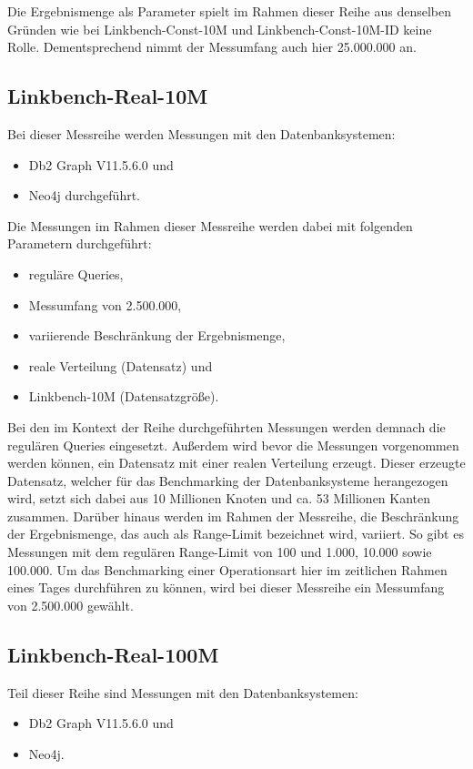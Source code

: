 Die Ergebnismenge als Parameter spielt im Rahmen dieser Reihe aus denselben Gründen wie bei Linkbench-Const-10M und Linkbench-Const-10M-ID keine Rolle. Dementsprechend nimmt der Messumfang auch hier 25.000.000 an.

\subsection{Linkbench-Real-10M}
Bei dieser Messreihe werden Messungen mit den Datenbanksystemen:
\begin{itemize}
    \item Db2 Graph V11.5.6.0 und 
    \item Neo4j durchgeführt. 
\end{itemize}

Die Messungen im Rahmen dieser Messreihe werden dabei mit folgenden Parametern durchgeführt:
\begin{itemize}
    \item reguläre Queries,
    \item Messumfang von 2.500.000,
    \item variierende Beschränkung der Ergebnismenge,
    \item reale Verteilung (Datensatz) und 
    \item Linkbench-10M (Datensatzgröße).
\end{itemize}
Bei den im Kontext der Reihe durchgeführten Messungen werden demnach die regulären Queries eingesetzt. Außerdem wird bevor die Messungen vorgenommen werden können, ein Datensatz mit einer realen Verteilung erzeugt. Dieser erzeugte Datensatz, welcher für das Benchmarking der Datenbanksysteme herangezogen wird, setzt sich dabei aus 10 Millionen Knoten und ca. 53 Millionen Kanten zusammen. Darüber hinaus werden im Rahmen der Messreihe, die Beschränkung der Ergebnismenge, das auch als Range-Limit bezeichnet wird, variiert. So gibt es Messungen mit dem regulären Range-Limit von 100 und 1.000, 10.000 sowie 100.000. Um das Benchmarking einer Operationsart hier im zeitlichen Rahmen eines Tages durchführen zu können, wird bei dieser Messreihe ein Messumfang von 2.500.000 gewählt. 

\subsection{Linkbench-Real-100M}
Teil dieser Reihe sind Messungen mit den Datenbanksystemen:
\begin{itemize}
    \item Db2 Graph V11.5.6.0 und 
    \item Neo4j. 
\end{itemize}

